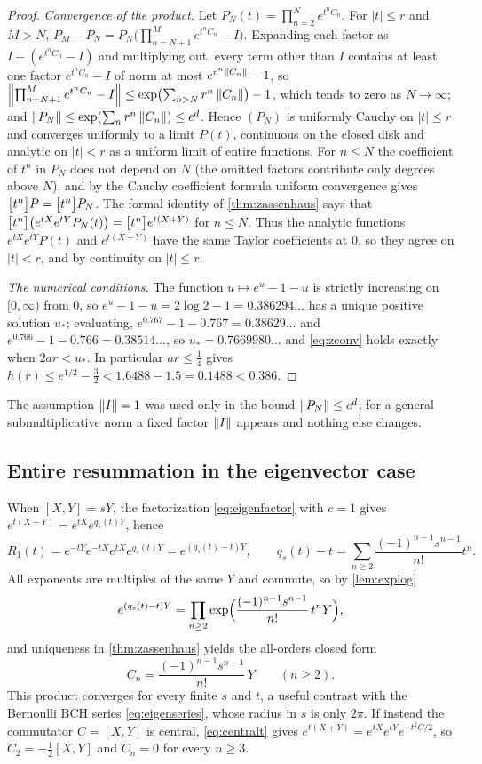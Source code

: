 \begin{proof}
\emph{Convergence of the product.} Let $P_N(t)=\prod_{n=2}^Ne^{t^nC_n}$.
For $|t|\leq r$ and $M>N$, $P_M-P_N=P_N\bigl(\prod_{n=N+1}^Me^{t^nC_n}-I\bigr)$.
Expanding each factor as $I+(e^{t^nC_n}-I)$ and multiplying out, every term
other than $I$ contains at least one factor $e^{t^nC_n}-I$ of norm at most
$e^{r^n\left\lVert C_n\right\rVert}-1$, so
$\left\lVert\prod_{n=N+1}^Me^{t^nC_n}-I\right\rVert\leq\exp\bigl(\sum_{n>N}r^n\left\lVert C_n\right\rVert\bigr)-1$,
which tends to zero as $N\to\infty$; and $\left\lVert P_N\right\rVert\leq\exp(\sum_nr^n\left\lVert C_n\right\rVert)\leq e^d$.
Hence $(P_N)$ is uniformly Cauchy on $|t|\leq r$ and converges uniformly to
a limit $P(t)$, continuous on the closed disk and analytic on $|t|<r$ as a
uniform limit of entire functions. For $n\leq N$ the coefficient of $t^n$ in
$P_N$ does not depend on $N$ (the omitted factors contribute only degrees
above $N$), and by the Cauchy coefficient formula uniform convergence gives
$\bigl[t^n\bigr]P=\bigl[t^n\bigr]P_N$. The formal identity of \cref{thm:zassenhaus}
says that $\bigl[t^n\bigr]\bigl(e^{tX}e^{tY}P_N(t)\bigr)=\bigl[t^n\bigr]e^{t(X+Y)}$
for $n\leq N$. Thus the analytic functions $e^{tX}e^{tY}P(t)$ and
$e^{t(X+Y)}$ have the same Taylor coefficients at $0$, so they agree on
$|t|<r$, and by continuity on $|t|\leq r$.

\emph{The numerical conditions.} The function $u\mapsto e^u-1-u$ is
strictly increasing on $[0,\infty)$ from $0$, so $e^{u}-1-u=2\log2-1
=0.386294\ldots$ has a unique positive solution $u_*$; evaluating,
$e^{0.767}-1-0.767=0.38629\ldots$ and $e^{0.766}-1-0.766=0.38514\ldots$, so
$u_*=0.7669980\ldots$ and \eqref{eq:zconv} holds exactly when
$2ar<u_*$. In particular $ar\leq\tfrac14$ gives
$h(r)\leq e^{1/2}-\tfrac32<1.6488-1.5=0.1488<0.386$.
\end{proof}
The assumption $\left\lVert I\right\rVert=1$ was used only in the bound $\left\lVert P_N\right\rVert\leq e^d$;
for a general submultiplicative norm a fixed factor $\left\lVert I\right\rVert$ appears and
nothing else changes.

\subsection{Entire resummation in the eigenvector case}
When $[X,Y]=sY$, the factorization \eqref{eq:eigenfactor} with $c=1$ gives
$e^{t(X+Y)}=e^{tX}e^{q_s(t)Y}$, hence
\[
 R_1(t)=e^{-tY}e^{-tX}e^{tX}e^{q_s(t)Y}=e^{(q_s(t)-t)Y},\qquad
 q_s(t)-t=\sum_{n\geq2}\frac{(-1)^{n-1}s^{n-1}}{n!}t^n.
\]
All exponents are multiples of the same $Y$ and commute, so by
\cref{lem:explog}
\[
 e^{(q_s(t)-t)Y}=\prod_{n\geq2}\exp\Bigl(\frac{(-1)^{n-1}s^{n-1}}{n!}\,t^nY\Bigr),
\]
and uniqueness in \cref{thm:zassenhaus} yields the all-orders closed form
\begin{equation}\label{eq:eigenzass}
 \boxed{\displaystyle C_n=\frac{(-1)^{n-1}s^{n-1}}{n!}\,Y\qquad(n\geq2).}
\end{equation}
This product converges for every finite $s$ and $t$, a useful contrast with
the Bernoulli BCH series \eqref{eq:eigenseries}, whose radius in $s$ is only
$2\pi$. If instead the commutator $C=[X,Y]$ is central, \eqref{eq:centralt}
gives $e^{t(X+Y)}=e^{tX}e^{tY}e^{-t^2C/2}$, so $C_2=-\tfrac12[X,Y]$ and
$C_n=0$ for every $n\geq3$.
